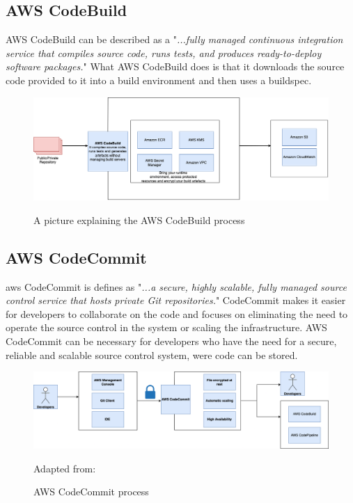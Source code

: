 \subsection{AWS CodeBuild }
AWS CodeBuild can be described as a "\textit{...fully managed continuous integration service that compiles source code, runs tests, and produces ready-to-deploy software packages.}"
\cite{AWSCodeBuild}
What AWS CodeBuild does is that it downloads the source code provided to it into a build environment and then uses a \Gls{buildspec}.\cite{AWSCodeBuild1}
\begin{figure}[htp]
    \centering
    \includegraphics[width=1\columnwidth]{Images/CodeBuild.png}
    \caption{A picture explaining the AWS CodeBuild process}\cite{AWSCodeBuild}
    \label{fig:my_label}
\end{figure}
\newpage
\subsection{AWS CodeCommit}

\acrshort{aws} CodeCommit is defines as "\textit{...a secure, highly scalable, fully managed source control service that hosts private Git repositories.}"
\cite{AWSCodeCommit1}
CodeCommit makes it easier for developers to collaborate on the code and focuses on eliminating the need to operate the source control in the system or scaling the infrastructure. AWS CodeCommit can be necessary for developers who have the need for a secure, reliable and scalable source control system, were code can be stored. \cite{AWSCodeCommit}
\begin{figure}[htp]
    \centering
    \includegraphics[width=1\columnwidth]{Images/CodeCommit.png}
    \caption{AWS CodeCommit process} Adapted from: \cite{AWSCodeCommit1}
    \label{fig:my_label}
\end{figure}


